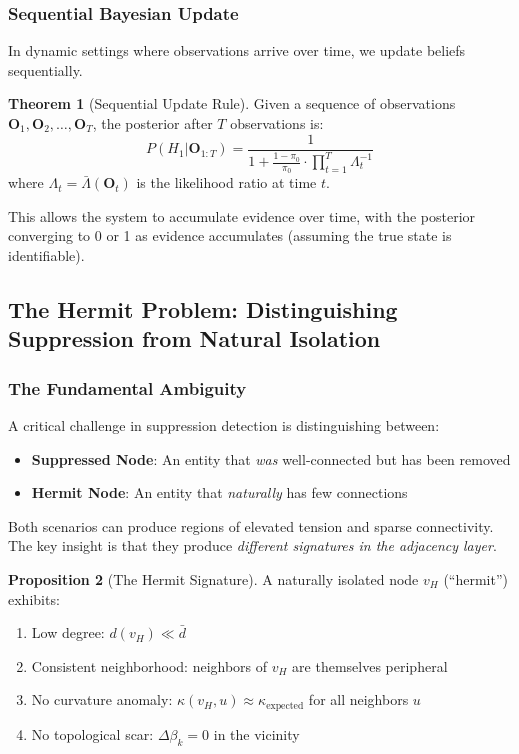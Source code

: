 \documentclass[12pt,a4paper]{article}
\theoremstyle{definition}
\newtheorem{theorem}{Theorem}[section]
\newtheorem{proposition}[theorem]{Proposition}
\theoremstyle{remark}
\begin{document}
\subsubsection{Sequential Bayesian Update}

In dynamic settings where observations arrive over time, we update beliefs sequentially.

\begin{theorem}[Sequential Update Rule]
\label{thm:sequential}
Given a sequence of observations $\mathbf{O}_1, \mathbf{O}_2, \ldots, \mathbf{O}_T$, the posterior after $T$ observations is:
\begin{equation}
    \boxed{
    P(H_1 | \mathbf{O}_{1:T}) = \frac{1}{1 + \frac{1-\pi_0}{\pi_0} \cdot \prod_{t=1}^{T} \Lambda_t^{-1}}
    }
\end{equation}
where $\Lambda_t = \bar{\Lambda}(\mathbf{O}_t)$ is the likelihood ratio at time $t$.
\end{theorem}

This allows the system to accumulate evidence over time, with the posterior converging to 0 or 1 as evidence accumulates (assuming the true state is identifiable).

\subsection{The Hermit Problem: Distinguishing Suppression from Natural Isolation}

\subsubsection{The Fundamental Ambiguity}

A critical challenge in suppression detection is distinguishing between:
\begin{itemize}
    \item \textbf{Suppressed Node}: An entity that \emph{was} well-connected but has been removed
    \item \textbf{Hermit Node}: An entity that \emph{naturally} has few connections
\end{itemize}

Both scenarios can produce regions of elevated tension and sparse connectivity. The key insight is that they produce \emph{different signatures in the adjacency layer}.

\begin{proposition}[The Hermit Signature]
A naturally isolated node $v_H$ (``hermit'') exhibits:
\begin{enumerate}
    \item Low degree: $d(v_H) \ll \bar{d}$
    \item Consistent neighborhood: neighbors of $v_H$ are themselves peripheral
    \item No curvature anomaly: $\kappa(v_H, u) \approx \kappa_{\text{expected}}$ for all neighbors $u$
    \item No topological scar: $\Delta\beta_k = 0$ in the vicinity
\end{enumerate}
\end{proposition}
\end{document}
